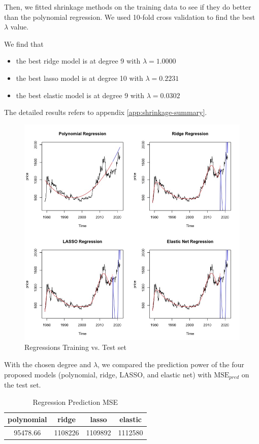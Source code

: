 \documentclass[paper=letter, fontsize=11pt]{scrartcl}
\begin{document}
Then, we fitted shrinkage methods on the training data to see if they do better than the polynomial regression. We used 10-fold cross validation to find the best $\lambda$ value. 

We find that
\begin{itemize}
    \item the best ridge model is at degree 9 with $\lambda=1.0000$
    \item the best lasso model is at degree 10 with $\lambda=0.2231$
    \item the best elastic model is at degree 9 with $\lambda=0.0302$
\end{itemize}
The detailed results refers to appendix \ref{app:shrinkage-summary}.

\begin{figure}[ht]
    \centering
    \includegraphics[width=0.75\linewidth]{Image/reg-summary.jpeg}
    \caption{Regressions Training vs. Test set}
    \label{fig:reg-summary}
\end{figure}

With the chosen degree and $\lambda$, we compared the prediction power of the four proposed models (polynomial, ridge, LASSO, and elastic net) with $\mathrm{MSE}_{pred}$ on the test set. 

\begin{table}[ht]
    \centering
    \begin{tabular}{|c|c|c|c|}
    \hline
    polynomial &  ridge  & lasso & elastic \\
    \hline\hline
    95478.66 & 1108226 & 1109892  & 1112580 \\
    \hline
    \end{tabular}
    \caption{Regression Prediction MSE}
\end{table}
\end{document}
